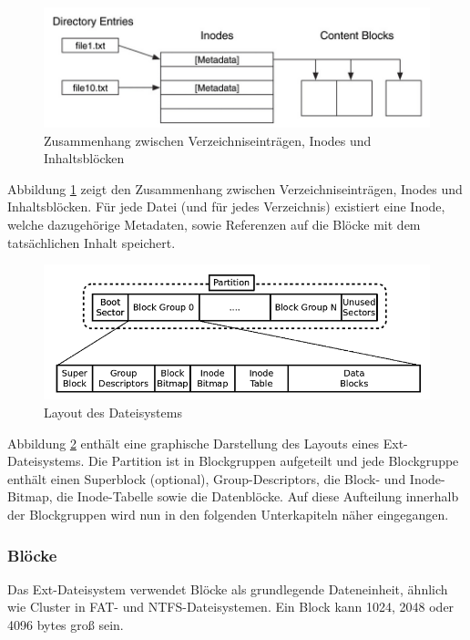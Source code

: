 \begin{figure}[H]
	\centering
	\includegraphics[width=12cm,keepaspectratio=true]{pictures/ext1.png}
	\caption{
		Zusammenhang zwischen Verzeichniseinträgen, Inodes und Inhaltsblöcken \cite{Carrier.06.01.2022}
	}
	\label{fig:ext1}
\end{figure}

Abbildung \ref{fig:ext1} zeigt den Zusammenhang zwischen Verzeichniseinträgen, Inodes und Inhaltsblöcken. Für jede Datei (und für jedes Verzeichnis) existiert eine Inode, welche dazugehörige Metadaten, sowie Referenzen auf die Blöcke mit dem tatsächlichen Inhalt speichert.

\begin{figure}[H]
	\centering
	\includegraphics[width=12cm,keepaspectratio=true]{pictures/layout.png}
	\caption{
		Layout des Dateisystems \cite{AnalysisExt4.07.01.2022}
	}
	\label{fig:layout}
\end{figure}

Abbildung \ref{fig:layout} enthält eine graphische Darstellung des Layouts eines Ext-Dateisystems. Die Partition ist in Blockgruppen aufgeteilt und jede Blockgruppe enthält einen Superblock (optional), Group-Descriptors, die Block- und Inode-Bitmap, die Inode-Tabelle sowie die Datenblöcke. Auf diese Aufteilung innerhalb der Blockgruppen wird nun in den folgenden Unterkapiteln näher eingegangen.

\subsubsection{Blöcke}

Das Ext-Dateisystem verwendet Blöcke als grundlegende Dateneinheit, ähnlich wie Cluster in FAT- und NTFS-Dateisystemen. Ein Block kann 1024, 2048 oder 4096 bytes groß sein.

